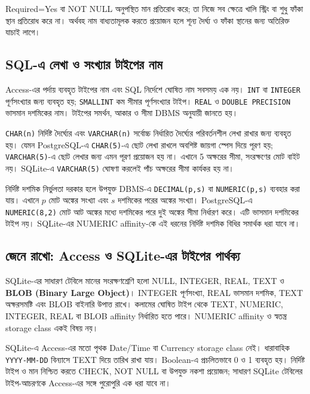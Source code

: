 Required=Yes বা NOT NULL অনুপস্থিত মান প্রতিরোধ করে; তা নিজে সব ক্ষেত্রে খালি স্ট্রিং বা শুধু ফাঁকা স্থান প্রতিরোধ করে না। অর্থবহ নাম বাধ্যতামূলক করতে প্রয়োজন হলে শূন্য দৈর্ঘ্য ও ফাঁকা স্থানের জন্য অতিরিক্ত যাচাই লাগে।

\subsection{SQL-এ লেখা ও সংখ্যার টাইপের নাম}
Access-এর পর্দায় ব্যবহৃত টাইপের নাম এবং SQL নির্দেশে ঘোষিত নাম সবসময় এক নয়। \texttt{INT} বা \texttt{INTEGER} পূর্ণসংখ্যার জন্য ব্যবহৃত হয়; \texttt{SMALLINT} কম সীমার পূর্ণসংখ্যার টাইপ। \texttt{REAL} ও \texttt{DOUBLE PRECISION} ভাসমান দশমিকের নাম। টাইপের সমর্থন, আকার ও সীমা DBMS অনুযায়ী জানতে হয়।

\texttt{CHAR(n)} নির্দিষ্ট দৈর্ঘ্যের এবং \texttt{VARCHAR(n)} সর্বোচ্চ নির্ধারিত দৈর্ঘ্যের পরিবর্তনশীল লেখা রাখার জন্য ব্যবহৃত হয়। যেমন PostgreSQL-এ \texttt{CHAR(5)}-এ ছোট লেখা রাখলে অবশিষ্ট জায়গা স্পেস দিয়ে পূরণ হয়; \texttt{VARCHAR(5)}-এ ছোট লেখার জন্য এমন পূরণ প্রয়োজন হয় না। এখানে 5 অক্ষরের সীমা, সংরক্ষণের মোট বাইট নয়। SQLite-এ \texttt{VARCHAR(5)} ঘোষণা করলেই পাঁচ অক্ষরের সীমা কার্যকর হয় না।

নির্দিষ্ট দশমিক নির্ভুলতা দরকার হলে উপযুক্ত DBMS-এ \texttt{DECIMAL(p,s)} বা \texttt{NUMERIC(p,s)} ব্যবহার করা যায়। এখানে $p$ মোট অঙ্কের সংখ্যা এবং $s$ দশমিকের পরের অঙ্কের সংখ্যা। PostgreSQL-এ \texttt{NUMERIC(8,2)} মোট আট অঙ্কের মধ্যে দশমিকের পরে দুই অঙ্কের সীমা নির্ধারণ করে। এটি ভাসমান দশমিকের টাইপ নয়। SQLite-এর NUMERIC affinity-কে এই ধরনের নির্দিষ্ট দশমিক বিধির সমার্থক ধরা যাবে না।

\subsection{জেনে রাখো: Access ও SQLite-এর টাইপের পার্থক্য}
SQLite-এর সাধারণ টেবিলে মানের সংরক্ষণশ্রেণি হলো NULL, INTEGER, REAL, TEXT ও \textbf{BLOB (Binary Large Object)}। INTEGER পূর্ণসংখ্যা, REAL ভাসমান দশমিক, TEXT অক্ষরসমষ্টি এবং BLOB বাইনারি উপাত্ত রাখে। কলামের ঘোষিত টাইপ থেকে TEXT, NUMERIC, INTEGER, REAL বা BLOB affinity নির্ধারিত হতে পারে। NUMERIC affinity ও স্বতন্ত্র storage class একই বিষয় নয়।

SQLite-এ Access-এর মতো পৃথক Date/Time বা Currency storage class নেই। ধারাবাহিক \texttt{YYYY-MM-DD} বিন্যাসে TEXT দিয়ে তারিখ রাখা যায়। Boolean-এ প্রচলিতভাবে 0 ও 1 ব্যবহৃত হয়। নির্দিষ্ট টাইপ ও মান নিশ্চিত করতে CHECK, NOT NULL বা উপযুক্ত নকশা প্রয়োজন; সাধারণ SQLite টেবিলের টাইপ-আচরণকে Access-এর সঙ্গে পুরোপুরি এক ধরা যাবে না।

